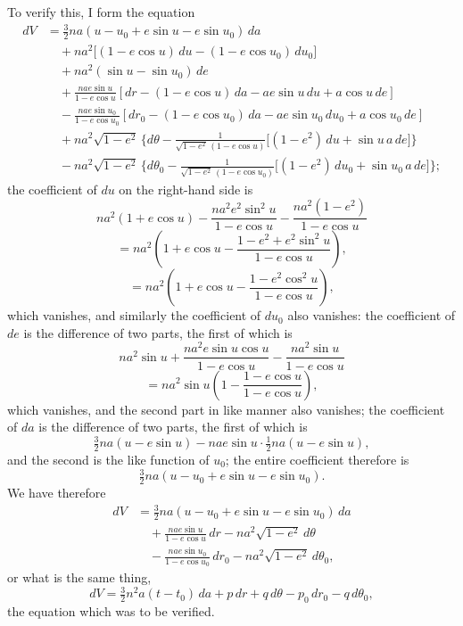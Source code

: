 \documentclass[11pt]{article}
\begin{document}
\clearpage

To verify this, I form the equation
\[
\begin{aligned}
dV &= \tfrac{3}{2}na(u-u_{0}+e\sin u-e\sin u_{0})\,da\\
&\quad + na^{2}\bigl[(1-e\cos u)\,du - (1-e\cos u_{0})\,du_{0}\bigr]\\
&\quad + na^{2}(\sin u - \sin u_{0})\,de\\
&\quad + \frac{nae\sin u}{1-e\cos u}\!\left[dr - (1-e\cos u)\,da - a e\sin u\,du + a\cos u\,de\right]\\
&\quad - \frac{nae\sin u_{0}}{1-e\cos u_{0}}\!\left[dr_{0} - (1-e\cos u_{0})\,da - a e\sin u_{0}\,du_{0} + a\cos u_{0}\,de\right]\\
&\quad + na^{2}\sqrt{1-e^{2}}\,\bigl\{d\theta - \tfrac{1}{\sqrt{1-e^{2}}\,(1-e\cos u)}\bigl[(1-e^{2})\,du + \sin u\,a\,de\bigr]\bigr\}\\
&\quad - na^{2}\sqrt{1-e^{2}}\,\bigl\{d\theta_{0} - \tfrac{1}{\sqrt{1-e^{2}}\,(1-e\cos u_{0})}\bigl[(1-e^{2})\,du_{0} + \sin u_{0}\,a\,de\bigr]\bigr\};
\end{aligned}
\]
the coefficient of $du$ on the right-hand side is
\[
na^{2}(1+e\cos u)-\frac{na^{2}e^{2}\sin^{2}u}{1-e\cos u}-\frac{na^{2}(1-e^{2})}{1-e\cos u}
\]
\[
= na^{2}\!\left(1+e\cos u - \frac{1-e^{2}+e^{2}\sin^{2}u}{1-e\cos u}\right),
\]
\[
= na^{2}\!\left(1+e\cos u - \frac{1-e^{2}\cos^{2}u}{1-e\cos u}\right),
\]
which vanishes, and similarly the coefficient of $du_{0}$ also vanishes: the coefficient of $de$ is the difference of two parts, the first of which is
\[
na^{2}\sin u + \frac{na^{2}e\sin u\cos u}{1-e\cos u} - \frac{na^{2}\sin u}{1-e\cos u}
\]
\[
= na^{2}\sin u\!\left(1 - \frac{1-e\cos u}{1-e\cos u}\right),
\]
which vanishes, and the second part in like manner also vanishes; the coefficient of $da$ is the difference of two parts, the first of which is
\[
\tfrac{3}{2}na(u-e\sin u) - nae\sin u\cdot\tfrac{1}{2}na(u-e\sin u),
\]
and the second is the like function of $u_{0}$; the entire coefficient therefore is
\[
\tfrac{3}{2}na(u-u_{0}+e\sin u-e\sin u_{0}).
\]
We have therefore
\[
\begin{aligned}
dV &= \tfrac{3}{2}na(u-u_{0}+e\sin u-e\sin u_{0})\,da\\
&\quad + \frac{nae\sin u}{1-e\cos u}\,dr - na^{2}\sqrt{1-e^{2}}\,d\theta\\
&\quad - \frac{nae\sin u_{0}}{1-e\cos u_{0}}\,dr_{0} - na^{2}\sqrt{1-e^{2}}\,d\theta_{0},
\end{aligned}
\]
or what is the same thing,
\[
dV = \tfrac{3}{2}n^{2}a(t-t_{0})\,da + p\,dr + q\,d\theta - p_{0}\,dr_{0} - q\,d\theta_{0},
\]
the equation which was to be verified.
\end{document}
